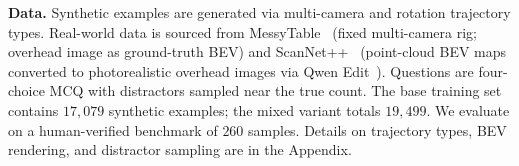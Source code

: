\noindent\textbf{Data.}
Synthetic examples are generated via multi-camera and rotation trajectory types.
Real-world data is sourced from MessyTable~\cite{cai2020messytable} (fixed multi-camera rig; overhead image as ground-truth BEV) and ScanNet++~\cite{yeshwanth2023scannet++} (point-cloud BEV maps converted to photorealistic overhead images via Qwen Edit~\cite{wu2025qwenimagetechnicalreport}).
Questions are four-choice MCQ with distractors sampled near the true count.
The base training set contains $17{,}079$ synthetic examples; the mixed variant totals $19{,}499$.
We evaluate on a human-verified benchmark of $260$ samples.
Details on trajectory types, BEV rendering, and distractor sampling are in the Appendix.

%



